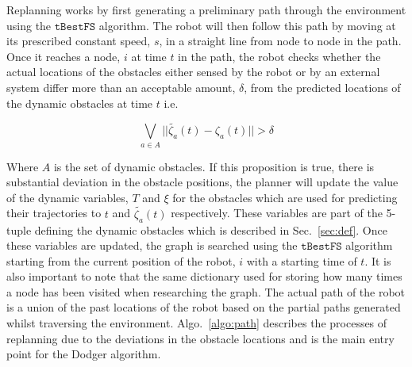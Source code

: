\documentclass[letterpaper, 10pt, conference]{ieeeconf}
\newcommand{\Acronym}[1]{\ensuremath{{{\texttt{#1}}}}}
\begin{document}
Replanning works by first generating a preliminary path through the environment
using the $\Acronym{tBestFS}$ algorithm. The robot will then follow this path
by moving at its prescribed constant speed, $s$, in a straight line from node
to node in the path. Once it reaches a node, $i$ at time $t$ in the path, the
robot checks whether the actual locations of the obstacles either sensed by the
robot or by an external system differ more than an acceptable amount, $\delta$,
from the predicted locations of the dynamic obstacles at time $t$ i.e.

$$\bigvee_{a \in A} ||\tilde{\zeta_a}(t) - \zeta_a(t)|| > \delta$$

Where $A$ is the set of dynamic obstacles. If this proposition is true, there
is substantial deviation in the obstacle positions, the planner will update the
value of the dynamic variables, $T$ and $\xi$ for the obstacles which are used
for predicting their trajectories to $t$ and $\tilde{\zeta_a}(t)$ respectively.
These variables are part of the 5-tuple defining the dynamic obstacles which is
described in Sec.~\ref{sec:def}. Once these variables are updated, the graph is
searched using the $\Acronym{tBestFS}$ algorithm starting from the current
position of the robot, $i$ with a starting time of $t$. It is also important to
note that the same dictionary used for storing how many times a node has been
visited when researching the graph. The actual path of the robot is a union of
the past locations of the robot based on the partial paths generated whilst
traversing the environment. Algo.~\ref{algo:path} describes the processes of
replanning due to the deviations in the obstacle locations and is the main
entry point for the Dodger algorithm.
\end{document}
